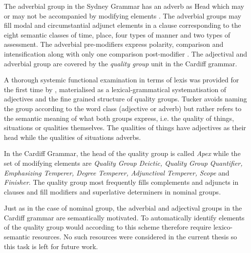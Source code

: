         
        
	
	The adverbial group in the Sydney Grammar has an adverb as Head which may or may not be accompanied by modifying elements \citep[419]{Halliday2013}. The adverbial groups may fill modal and circumstantial adjunct elements in a clause corresponding to the eight semantic classes of time, place, four types of manner and two types of assessment. The adverbial pre-modifiers express polarity, comparison and intensification along with only one comparison post-modifier \citep[420--421]{Halliday2013}. The adjectival and adverbial group are covered by the \textit{quality group} unit in the Cardiff grammar.
    
	A thorough systemic functional examination in terms of lexis was provided for the first time by \citet{Tucker1997,Tucker1998}, materialised as a lexical-grammatical systematisation of adjectives and the fine grained structure of quality groups. Tucker avoids naming the group according to the word class (adjective or adverb) but rather refers to the semantic meaning of what both groups express, i.e. the quality of things, situations or qualities themselves. The qualities of things have adjectives as their head while the qualities of situations adverbs.       
	
	In the Cardiff Grammar, the head of the quality group is called \textit{Apex} while the set of modifying elements are \textit{Quality Group Deictic, Quality Group Quantifier, Emphasizing Temperer, Degree Temperer, Adjunctival Temperer, Scope} and \textit{Finisher}. The quality group most frequently fills complements and adjuncts in clauses and fill modifiers and superlative determiners in nominal groups. 
	
	Just as in the case of nominal group, the adverbial and adjectival groups in the Cardiff grammar are semantically motivated. To automatically identify elements of the quality group would according to this scheme therefore require lexico-semantic resources. No such resources were considered in the current thesis so this task is left for future work. 
    
